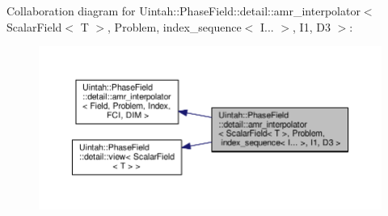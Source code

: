 Collaboration diagram for Uintah\+:\+:Phase\+Field\+:\+:detail\+:\+:amr\+\_\+interpolator$<$ Scalar\+Field$<$ T $>$, Problem, index\+\_\+sequence$<$ I... $>$, I1, D3 $>$\+:\nopagebreak
\begin{figure}[H]
\begin{center}
\leavevmode
\includegraphics[width=350pt]{classUintah_1_1PhaseField_1_1detail_1_1amr__interpolator_3_01ScalarField_3_01T_01_4_00_01Problemb4baeed8e1c07f67a29c180b13cabc08}
\end{center}
\end{figure}
